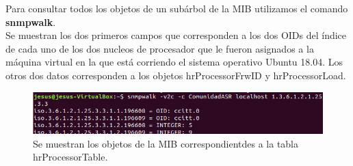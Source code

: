 Para consultar todos los objetos de un subárbol de la MIB utilizamos el comando \textbf{snmpwalk}.\\

Se muestran los dos primeros campos que corresponden a los dos OIDs del índice de cada uno de los dos nucleos de procesador que le fueron asignados a la máquina virtual en la que está corriendo el sistema operativo Ubuntu 18.04. Los otros dos datos corresponden a los objetos hrProcessorFrwID y hrProcessorLoad.

\pagebreak
\begin{figure}[!htpb]
	\hypertarget{fig:tarea3}{\hspace{1pt}}
	\begin{center}
		\includegraphics{imagenes/tarea3.png}
		\caption{Se muestran los objetos de la MIB correspondientdes a la tabla hrProcessorTable.}
		\label{fig:tarea3}	
	\end{center}
\end{figure}